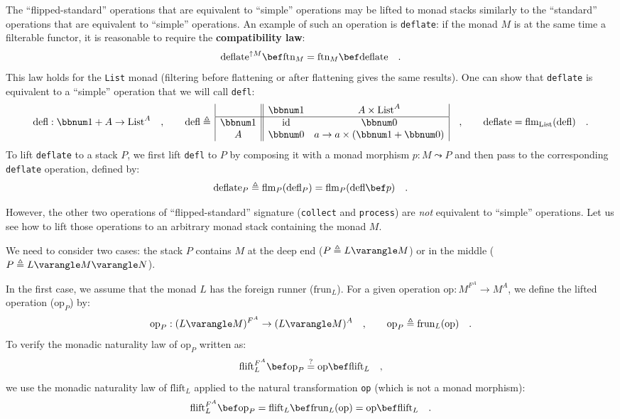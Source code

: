 The \textsf{``}flipped-standard\textsf{''} operations that are equivalent to \textsf{``}simple\textsf{''}
operations may be lifted to monad stacks similarly to the \textsf{``}standard\textsf{''}
operations that are equivalent to \textsf{``}simple\textsf{''} operations. An example
of such an operation is \lstinline!deflate!: if the monad $M$ is
at the same time a filterable functor, it is reasonable to require
the \textbf{compatibility
law}:
\begin{equation}
\text{deflate}^{\uparrow M}\bef\text{ftn}_{M}=\text{ftn}_{M}\bef\text{deflate}\quad.\label{eq:compatibility-law-deflate-flatten}
\end{equation}
This law holds for the \lstinline!List! monad (filtering before flattening
or after flattening gives the same results). One can show that \lstinline!deflate!
is equivalent to a \textsf{``}simple\textsf{''} operation that we will call \lstinline!defl!:
\[
\text{defl}:\bbnum 1+A\rightarrow\text{List}^{A}\quad,\quad\quad\text{defl}\triangleq\,\begin{array}{|c||cc|}
 & \bbnum 1 & A\times\text{List}^{A}\\
\hline \bbnum 1 & \text{id} & \bbnum 0\\
A & \bbnum 0 & a\rightarrow a\times(\bbnum 1+\bbnum 0)
\end{array}\quad,\quad\quad\text{deflate}=\text{flm}_{\text{List}}(\text{defl})\quad.
\]
To lift \lstinline!deflate! to a stack $P$, we first lift \lstinline!defl!
to $P$ by composing it with a monad morphism $p:M\leadsto P$ and
then pass to the corresponding \lstinline!deflate! operation, defined
by:
\[
\text{deflate}_{P}\triangleq\text{flm}_{P}(\text{defl}_{P})=\text{flm}_{P}(\text{defl}\bef p)\quad.
\]

However, the other two operations of \textsf{``}flipped-standard\textsf{''} signature
(\lstinline!collect! and \lstinline!process!) are \emph{not} equivalent
to \textsf{``}simple\textsf{''} operations. Let us see how to lift those operations
to an arbitrary monad stack containing the monad $M$.

We need to consider two cases: the stack $P$ contains $M$ at the
deep end ($P\triangleq L\varangle M$) or in the middle ($P\triangleq L\varangle M\varangle N$). 

In the first case, we assume that the monad $L$ has the foreign runner
($\text{frun}_{L}$). For a given operation $\text{op}:M^{F^{A}}\rightarrow M^{A}$,
we define the lifted operation ($\text{op}_{P}$) by:
\[
\text{op}_{P}:(L\varangle M)^{F^{A}}\rightarrow(L\varangle M)^{A}\quad,\quad\quad\text{op}_{P}\triangleq\text{frun}_{L}(\text{op})\quad.
\]
To verify the monadic naturality law of $\text{op}_{P}$ written as:
\[
\text{flift}_{L}^{F^{A}}\bef\text{op}_{P}\overset{?}{=}\text{op}\bef\text{flift}_{L}\quad,
\]
we use the monadic naturality law of $\text{flift}_{L}$ applied to
the natural transformation \lstinline!op! (which is not a monad morphism):
\[
\text{flift}_{L}^{F^{A}}\bef\text{op}_{P}=\text{flift}_{L}\bef\text{frun}_{L}(\text{op})=\text{op}\bef\text{flift}_{L}\quad.
\]


